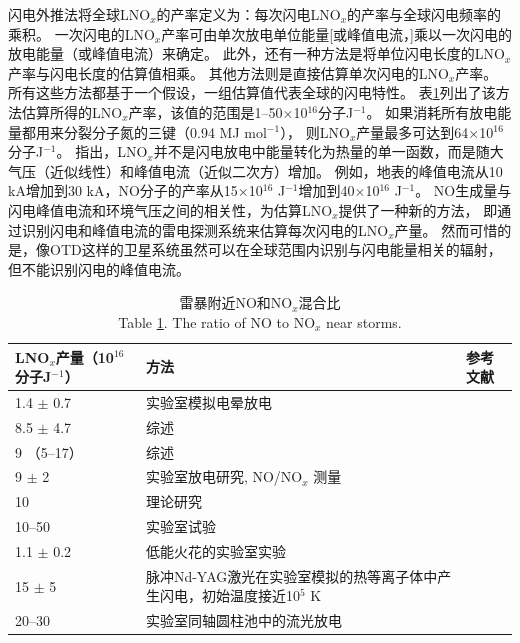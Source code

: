 闪电外推法将全球LNO$_x$的产率定义为：每次闪电LNO$_x$的产率与全球闪电频率的乘积\citep{Lawrence.1995}。
一次闪电的LNO$_x$产率可由单次放电单位能量[或峰值电流，\citet{Wang.1998}]乘以一次闪电的放电能量（或峰值电流）来确定。
此外，还有一种方法是将单位闪电长度的LNO$_x$产率与闪电长度的估算值相乘。
其他方法则是直接估算单次闪电的LNO$_x$产率。
所有这些方法都基于一个假设，一组估算值代表全球的闪电特性。
表\ref{table:LNOx/J}列出了该方法估算所得的LNO$_x$产率，该值的范围是1--50$\times$10$^{16}$分子J$^{-1}$。
如果消耗所有放电能量都用来分裂分子氮的三键（0.94 MJ mol$^{-1}$），
则LNO$_x$产量最多可达到64$\times$10$^{16}$分子J$^{-1}$。
\citet{Wang.1998}指出，LNO$_x$并不是闪电放电中能量转化为热量的单一函数，而是随大气压（近似线性）和峰值电流（近似二次方）增加。
例如，地表的峰值电流从10 kA增加到30 kA，NO分子的产率从15$\times$10$^{16}$ J$^{-1}$增加到40$\times$10$^{16}$ J$^{-1}$。
NO生成量与闪电峰值电流和环境气压之间的相关性，为估算LNO$_x$提供了一种新的方法，
即通过识别闪电和峰值电流的雷电探测系统来估算每次闪电的LNO$_x$产量。
然而可惜的是，像OTD这样的卫星系统虽然可以在全球范围内识别与闪电能量相关的辐射\citep{Baker.1999}，但不能识别闪电的峰值电流。

{
\centering
\footnotesize
\begin{longtable}
{|p{8em}|p{18em}|p{12em}|}
\caption{雷暴附近NO和NO$_x$混合比\\
Table \ref{table:LNOx/J}. The ratio of NO to NO$_x$ near storms.}
\label{table:LNOx/J} \\
\hline
LNO$_x$产量（10$^{16}$分子J$^{-1}$）   & 方法                          & 参考文献 \\ \hline
1.4 $\pm$ 0.7                                  & 实验室模拟电晕放电              & \citet{Hill.1988} \\ \hline
8.5 $\pm$ 4.7                                  & 综述                          & \citet{Lawrence.1995} \\ \hline
9 （5--17）                                    & 综述                          & \citet{Biazar.1995} \\ \hline
9 $\pm$ 2                                      & 实验室放电研究, NO/NO$_x$ 测量     & \citet{Stark.1996} \\ \hline
10                                           & 理论研究                      & \citet{Price.1997a,Price.1997b} \\ \hline
10--50                                       & 实验室试验                    & \citet{Wang.1998} \\ \hline
1.1 $\pm$ 0.2                                  & 低能火花的实验室实验            & \citet{Cook.2000} \\ \hline
15 $\pm$ 5    & 脉冲Nd-YAG激光在实验室模拟的热等离子体中产生闪电，初始温度接近10$^5$ K    & \citet{Navarro-Gonzalez.2001} \\ \hline
20--30      & 实验室同轴圆柱池中的流光放电                                       & \citet{Cooray.2005} \\ \hline
\end{longtable}\par
}


